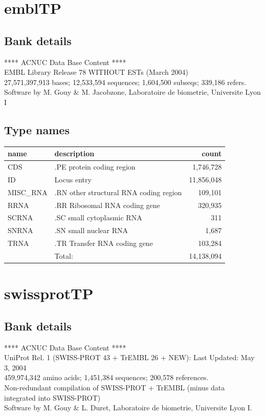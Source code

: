 \documentclass{article}
\begin{document}
\begin{Schunk}
\section{ emblTP }
\subsection{Bank details}
             ****     ACNUC Data Base Content      ****                         \\
              EMBL Library Release 78 WITHOUT ESTs  (March 2004)\\
27,571,397,913 bases; 12,533,594 sequences; 1,604,500 subseqs; 339,186 refers.\\
Software by M. Gouy \& M. Jacobzone, Laboratoire de biometrie, Universite Lyon I 

\subsection{Type names}
\noindent\begin{tabular}{llr}
\hline \hline
name & description & count \\
\hline
CDS  &  .PE protein coding region  &  1,746,728 \\
ID  &  Locus entry  &  11,856,048 \\
MISC\_RNA  &  .RN other structural RNA coding region  &  109,101 \\
RRNA  &  .RR Ribosomal RNA coding gene  &  320,935 \\
SCRNA  &  .SC small cytoplasmic RNA  &  311 \\
SNRNA  &  .SN small nuclear RNA  &  1,687 \\
TRNA  &  .TR Transfer RNA coding gene  &  103,284 \\
\hline
 & Total: & 14,138,094 \\
\hline \hline
\end{tabular}

\section{ swissprotTP }
\subsection{Bank details}
               ****     ACNUC Data Base Content      ****                       \\
  UniProt Rel. 1 (SWISS-PROT 43 + TrEMBL 26 + NEW): Last Updated: May  3, 2004\\
          459,974,342 amino acids; 1,451,384 sequences; 200,578 references.\\
          Non-redundant compilation of SWISS-PROT + TrEMBL (minus  data  \\
                     integrated  into  SWISS-PROT)\\
Software by M. Gouy \& L. Duret, Laboratoire de biometrie, Universite Lyon I.


\end{Schunk}
\end{document}
